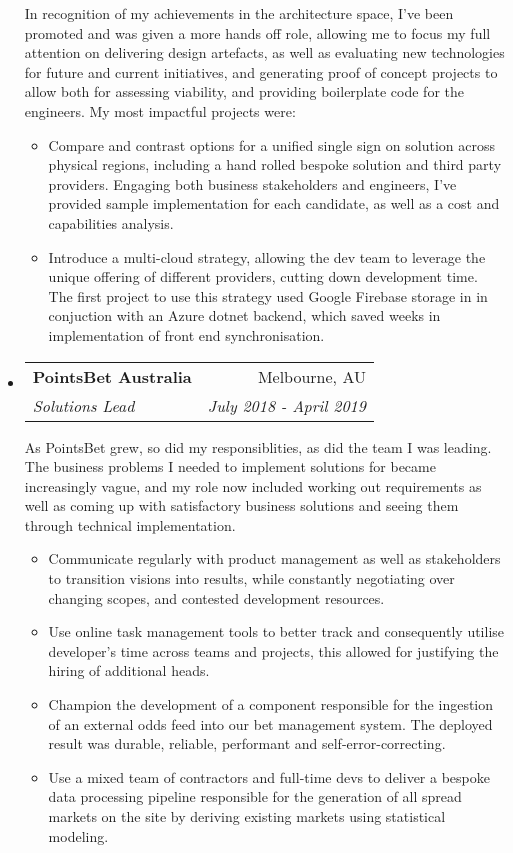 \documentclass[letterpaper,11pt]{article}
\makeatletter
\newcommand{\resitem}[1]{\item #1 \vspace{-2pt}}
\newcommand{\ressubheading}[4]{
\begin{tabular*}{6.5in}{l@{\cftdotfill{\cftsecdotsep}\extracolsep{\fill}}r}
		\textbf{#1} & #2 \\
		\textit{#3} & \textit{#4} \\
\end{tabular*}}
\makeatother
\begin{document}
\begin{itemize}
    In recognition of my achievements in the architecture space, I've been promoted and was given a more hands off role, allowing me to focus my full attention on delivering design artefacts, as well as evaluating new technologies for future and current initiatives, and generating proof of concept projects to allow both for assessing viability, and providing boilerplate code for the engineers.
    My most impactful projects were:
    
    \begin{itemize}
        \resitem{Compare and contrast options for a unified single sign on solution across physical regions, including a hand rolled bespoke solution and third party providers. Engaging both business stakeholders and engineers, I've provided sample implementation for each candidate, as well as a cost and capabilities analysis.}
        \resitem{Introduce a multi-cloud strategy, allowing the dev team to leverage the unique offering of different providers, cutting down development time. The first project to use this strategy used Google Firebase storage in in conjuction with an Azure dotnet backend, which saved weeks in implementation of front end synchronisation.}
    \end{itemize}
    
\item[]
	\ressubheading{PointsBet Australia}{Melbourne, AU}{Solutions Lead}{July 2018 - April 2019}
	
	As PointsBet grew, so did my responsiblities, as did the team I was leading. The business problems I needed to implement solutions for became increasingly vague, and my role now included working out requirements as well as coming up with satisfactory business solutions and seeing them through technical implementation.
	
    \begin{itemize}
    	\resitem{Communicate regularly with product management as well as stakeholders to transition visions into results, while constantly negotiating over changing scopes, and contested development resources.}
    	\resitem{Use online task management tools to better track and consequently utilise developer's time across teams and projects, this allowed for justifying the hiring of additional heads.}
    	\resitem{Champion the development of a component responsible for the ingestion of an external odds feed into our bet management system. The deployed result was durable, reliable, performant and self-error-correcting.}
    	\resitem{Use a mixed team of contractors and full-time devs to deliver a bespoke data processing pipeline responsible for the generation of all spread markets on the site by deriving existing markets using statistical modeling.}
    \end{itemize}
	

\end{itemize}
\end{document}
